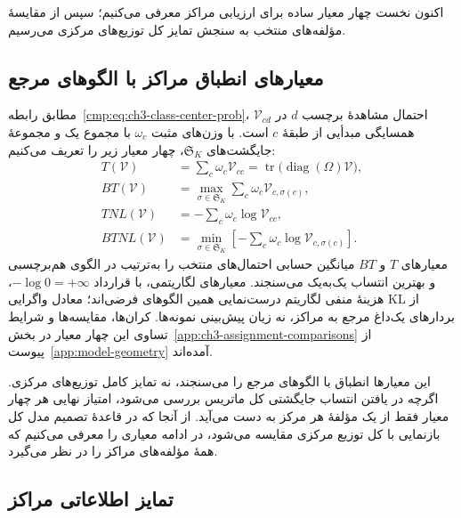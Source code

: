 اکنون نخست چهار معیار ساده برای ارزیابی مراکز معرفی
می‌کنیم؛ سپس از مقایسهٔ مؤلفه‌های منتخب به سنجش تمایز
کل توزیع‌های مرکزی می‌رسیم.

\subsection{معیارهای انطباق مراکز با الگوهای مرجع}
\label{cmp:subsec:ch3-center-separation-criteria}
\label{cmp:subsubsec:ch3-T}
\label{cmp:subsubsec:ch3-BT}
\label{cmp:subsubsec:ch3-TNL}
\label{cmp:subsubsec:ch3-BTNL}

مطابق رابطه~\eqref{cmp:eq:ch3-class-center-prob}،
$\mathcal V_{cd}$ احتمال مشاهدهٔ برچسب $d$ در
همسایگی مبدأیی از طبقهٔ $c$ است. با وزن‌های مثبت
$\omega_c$ با مجموع یک و مجموعهٔ جایگشت‌های
$\mathfrak S_K$، چهار معیار زیر را تعریف می‌کنیم:
\begin{align}
T(\mathcal V)&=\sum_c\omega_c\mathcal V_{cc}
=\operatorname{tr}\bigl(\operatorname{diag}(\Omega)\mathcal V\bigr),
\label{cmp:eq:ch3-T-on-V}\\
BT(\mathcal V)&=\max_{\sigma\in\mathfrak S_K}
\sum_c\omega_c\mathcal V_{c,\sigma(c)},
\label{cmp:eq:ch3-BT-on-V}\\
TNL(\mathcal V)&=-\sum_c\omega_c\log\mathcal V_{cc},
\label{cmp:eq:ch3-TNL-on-V}\\
BTNL(\mathcal V)&=\min_{\sigma\in\mathfrak S_K}
\left[-\sum_c\omega_c\log\mathcal V_{c,\sigma(c)}\right].
\label{cmp:eq:ch3-BTNL-on-V}
\end{align}
معیارهای $T$ و $BT$ میانگین حسابی احتمال‌های
منتخب را به‌ترتیب در الگوی هم‌برچسبی و بهترین
انتساب یک‌به‌یک می‌سنجند. معیارهای لگاریتمی،
با قرارداد $-\log0=+\infty$، هزینهٔ منفی
لگاریتم درست‌نمایی همین الگوهای فرضی‌اند؛
معادل واگرایی KL از بردارهای یک‌داغ مرجع به
مراکز، نه زیان پیش‌بینی نمونه‌ها.
کران‌ها، مقایسه‌ها و شرایط تساوی این چهار معیار
در بخش~\ref{app:ch3-assignment-comparisons}
از پیوست~\ref{app:model-geometry} آمده‌اند.

این معیارها انطباق با الگوهای مرجع را می‌سنجند،
نه تمایز کامل توزیع‌های مرکزی. اگرچه در یافتن
انتساب جایگشتی کل ماتریس بررسی می‌شود، امتیاز
نهایی هر چهار معیار فقط از یک مؤلفهٔ هر مرکز
به دست می‌آید. از آنجا که در قاعدهٔ تصمیم مدل
کل بازنمایی با کل توزیع مرکزی مقایسه می‌شود،
در ادامه معیاری را معرفی می‌کنیم که همهٔ
مؤلفه‌های مراکز را در نظر می‌گیرد.

\subsection{تمایز اطلاعاتی مراکز}
\label{cmp:subsubsec:ch3-I-criterion}

